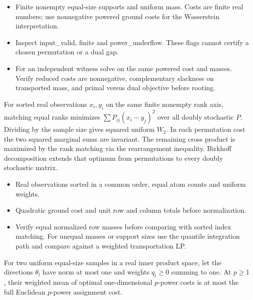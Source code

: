 \expandafter\def\csname statadic@assumptions@STATADIC-TRANSPORT-002\endcsname{\begin{itemize}
\item Finite nonempty equal-size supports and uniform mass. Costs are finite real numbers; use nonnegative powered ground costs for the Wasserstein interpretation.
\end{itemize}}
\expandafter\def\csname statadic@diagnostics@STATADIC-TRANSPORT-002\endcsname{\begin{itemize}
\item Inspect input\_valid, finite and power\_underflow. These flags cannot certify a chosen permutation or a dual gap.
\item For an independent witness solve on the same powered cost and masses. Verify reduced costs are nonnegative, complementary slackness on transported mass, and primal versus dual objective before rooting.
\end{itemize}}
\expandafter\def\csname statadic@statement@STATADIC-TRANSPORT-003\endcsname{For sorted real observations $x_i,y_i$ on the same finite nonempty
  rank axis, matching equal ranks minimizes $\sum P_{ij}(x_i-y_j)^2$ over all
  doubly stochastic $P$. Dividing by the sample size gives squared uniform $W_2$.}
\expandafter\def\csname statadic@proof@STATADIC-TRANSPORT-003\endcsname{In each permutation cost the two squared marginal sums are
  invariant. The remaining cross product is maximized by the rank matching via
  the rearrangement inequality. Birkhoff decomposition extends that optimum
  from permutations to every doubly stochastic matrix.}
\expandafter\def\csname statadic@assumptions@STATADIC-TRANSPORT-003\endcsname{\begin{itemize}
\item Real observations sorted in a common order, equal atom counts and uniform weights.
\item Quadratic ground cost and unit row and column totals before normalization.
\end{itemize}}
\expandafter\def\csname statadic@diagnostics@STATADIC-TRANSPORT-003\endcsname{\begin{itemize}
\item Verify equal normalized row masses before comparing with sorted index matching. For unequal masses or support sizes use the quantile integration path and compare against a weighted transportation LP.
\end{itemize}}
\expandafter\def\csname statadic@statement@STATADIC-TRANSPORT-004\endcsname{For two uniform equal-size samples in a real inner product space,
  let the directions $\theta_l$ have norm at most one and weights $q_l\ge0$
  summing to one. At $p\ge1$, their weighted mean of optimal one-dimensional
  $p$-power costs is at most the full Euclidean $p$-power assignment cost.}
